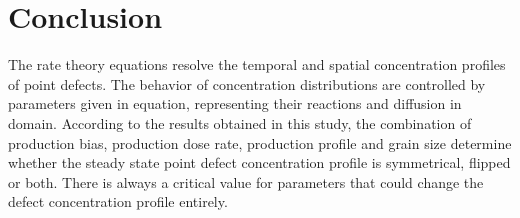\documentclass[a4paper]{article}
\begin{document}
\newpage
\section{Conclusion} \hspace{10pt}

The rate theory equations resolve the temporal and spatial concentration profiles of point defects. The behavior of concentration distributions are controlled by parameters given in equation, representing their reactions and diffusion in domain. According to the results obtained in this study, the combination of production bias, production dose rate, production profile and grain size determine whether the steady state point defect concentration profile is symmetrical, flipped or both. There is always a critical value for parameters that could change the defect concentration profile entirely.



\end{document}
